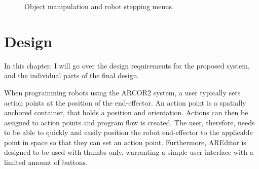 \begin{figure}
    \centering
    \quad
    \caption{Object manipulation and robot stepping menus.}
    \label{manipulationandstepping}
\end{figure}

\chapter{Design}
In this chapter, I will go over the design requirements for the proposed system, and the individual parts of the final design.

When programming robots using the ARCOR2 system, a user typically sets action points at the position of the end-effector. An action point is a spatially anchored container, that holds a position and orientation. Actions can then be assigned to action points and program flow is created. The user, therefore, needs to be able to quickly and easily position the robot end-effector to the applicable point in space so that they can set an action point. Furthermore, AREditor is designed to be used with thumbs only, warranting a simple user interface with a limited amount of buttons. 

